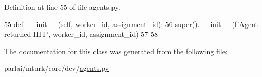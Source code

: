 Definition at line 55 of file agents.\+py.


\begin{DoxyCode}
55     \textcolor{keyword}{def }\_\_init\_\_(self, worker\_id, assignment\_id):
56         super().\_\_init\_\_(f\textcolor{stringliteral}{'Agent returned HIT'}, worker\_id, assignment\_id)
57 
58 
\end{DoxyCode}


The documentation for this class was generated from the following file\+:\begin{DoxyCompactItemize}
\item 
parlai/mturk/core/dev/\hyperlink{parlai_2mturk_2core_2dev_2agents_8py}{agents.\+py}\end{DoxyCompactItemize}
